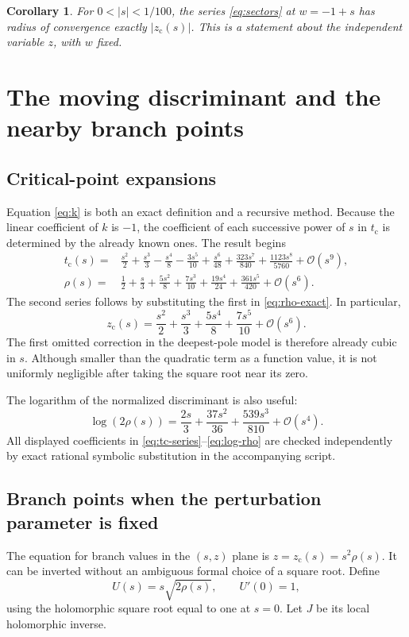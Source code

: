 \documentclass[11pt,a4paper]{article}
\newtheorem{corollary}[theorem]{Corollary}
\theoremstyle{definition}
\theoremstyle{remark}
\newcommand{\OO}{\mathcal O}
\newcommand{\tc}{t_{\mathrm c}}
\newcommand{\zc}{z_{\mathrm c}}
\begin{document}
\begin{corollary}\label{cor:z-radius}
For $0<|s|<1/100$, the series \eqref{eq:sectors} at $w=-1+s$ has radius
of convergence exactly $|\zc(s)|$. This is a statement about the
independent variable $z$, with $w$ fixed.
\end{corollary}

\section{The moving discriminant and the nearby branch points}
\label{sec:critical}

\subsection{Critical-point expansions}
Equation \eqref{eq:k} is both an exact definition and a recursive method.
Because the linear coefficient of $k$ is $-1$, the coefficient of each
successive power of $s$ in $\tc$ is determined by the already known ones.
The result begins
\begin{align}
 \tc(s)={}&\frac{s^2}{2}+\frac{s^3}{3}-\frac{s^4}{8}
 -\frac{3s^5}{10}+\frac{s^6}{48}
 +\frac{323s^7}{840}+\frac{1123s^8}{5760}+\OO(s^9),
 \label{eq:tc-series}\\
 \rho(s)={}&\frac12+\frac s3+\frac{5s^2}{8}
 +\frac{7s^3}{10}+\frac{19s^4}{24}
 +\frac{361s^5}{420}+\OO(s^6).
 \label{eq:rho-series}
\end{align}
The second series follows by substituting the first in
\eqref{eq:rho-exact}. In particular,
\begin{equation}\label{eq:zc-series}
 \zc(s)=\frac{s^2}{2}+\frac{s^3}{3}+\frac{5s^4}{8}
                  +\frac{7s^5}{10}+\OO(s^6).
\end{equation}
The first omitted correction in the deepest-pole model is therefore
already cubic in $s$. Although smaller than the quadratic term as a
function value, it is not uniformly negligible after taking the square
root near its zero.

The logarithm of the normalized discriminant is also useful:
\begin{equation}\label{eq:log-rho}
 \log(2\rho(s))=\frac{2s}{3}+\frac{37s^2}{36}
                    +\frac{539s^3}{810}+\OO(s^4).
\end{equation}
All displayed coefficients in \eqref{eq:tc-series}--\eqref{eq:log-rho}
are checked independently by exact rational symbolic substitution in the
accompanying script.

\subsection{Branch points when the perturbation parameter is fixed}
The equation for branch values in the $(s,z)$ plane is
$z=\zc(s)=s^2\rho(s)$. It can be inverted without an ambiguous formal
choice of a square root. Define
\[
 U(s)=s\sqrt{2\rho(s)},\qquad U'(0)=1,
\]
using the holomorphic square root equal to one at $s=0$. Let $J$ be its
local holomorphic inverse.
\end{document}
